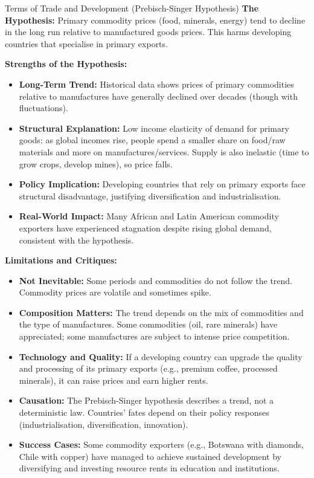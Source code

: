 \documentclass[11pt, a4paper, twoside]{book}
\begin{document}
\begin{evaluation}{Terms of Trade and Development (Prebisch-Singer Hypothesis)}
\textbf{The Hypothesis:} Primary commodity prices (food, minerals, energy) tend to decline in the long run relative to manufactured goods prices. This harms developing countries that specialise in primary exports.

\textbf{Strengths of the Hypothesis:}
\begin{itemize}
  \item \textbf{Long-Term Trend:} Historical data shows prices of primary commodities relative to manufactures have generally declined over decades (though with fluctuations).
  \item \textbf{Structural Explanation:} Low income elasticity of demand for primary goods: as global incomes rise, people spend a smaller share on food/raw materials and more on manufactures/services. Supply is also inelastic (time to grow crops, develop mines), so price falls.
  \item \textbf{Policy Implication:} Developing countries that rely on primary exports face structural disadvantage, justifying diversification and industrialisation.
  \item \textbf{Real-World Impact:} Many African and Latin American commodity exporters have experienced stagnation despite rising global demand, consistent with the hypothesis.
\end{itemize}

\textbf{Limitations and Critiques:}
\begin{itemize}
  \item \textbf{Not Inevitable:} Some periods and commodities do not follow the trend. Commodity prices are volatile and sometimes spike.
  \item \textbf{Composition Matters:} The trend depends on the mix of commodities and the type of manufactures. Some commodities (oil, rare minerals) have appreciated; some manufactures are subject to intense price competition.
  \item \textbf{Technology and Quality:} If a developing country can upgrade the quality and processing of its primary exports (e.g., premium coffee, processed minerals), it can raise prices and earn higher rents.
  \item \textbf{Causation:} The Prebisch-Singer hypothesis describes a trend, not a deterministic law. Countries' fates depend on their policy responses (industrialisation, diversification, innovation).
  \item \textbf{Success Cases:} Some commodity exporters (e.g., Botswana with diamonds, Chile with copper) have managed to achieve sustained development by diversifying and investing resource rents in education and institutions.
\end{itemize}


\end{evaluation}
\end{document}
